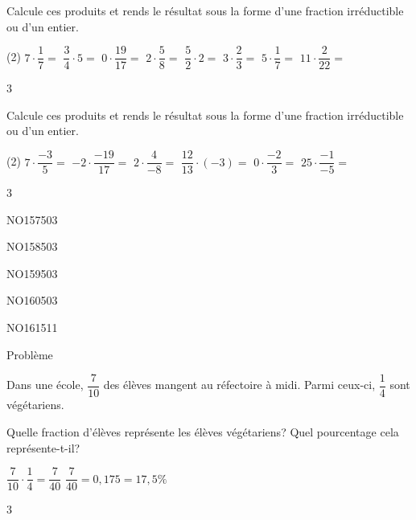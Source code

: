 \documentclass[a4paper,11pt]{report}
\begin{document}
\begin{exop}{
Calcule ces produits et rends le résultat sous la forme d'une fraction irréductible ou d'un entier.
\begin{tasks}(2)
	\task $7\cdot \dfrac{1}{7}=$
    \task $\dfrac{3}{4}\cdot5=$
	\task $0\cdot \dfrac{19}{17}=$
	\task $2\cdot \dfrac{5}{8}=$
    \task $\dfrac{5}{2}\cdot2=$
	\task $3\cdot \dfrac{2}{3}=$
	\task $5\cdot \dfrac{1}{7}=$
	\task $11\cdot \dfrac{2}{22}=$
\end{tasks}
}{3}
\end{exop}

\begin{exop}{
Calcule ces produits et rends le résultat sous la forme d'une fraction irréductible ou d'un entier.
\begin{tasks}(2)
	\task $7\cdot \dfrac{-3}{5}=$
	\task $-2\cdot \dfrac{-19}{17}=$
	\task $2\cdot \dfrac{4}{-8}=$
    \task $\dfrac{12}{13}\cdot(-3)=$
	\task $0\cdot \dfrac{-2}{3}=$
	\task $25\cdot \dfrac{-1}{-5}=$
\end{tasks}
}{3}
\end{exop}

\begin{exof}{NO157}{50}{3}
\end{exof}
\begin{exof}{NO158}{50}{3}
\end{exof}
\begin{exof}{NO159}{50}{3}
\end{exof}
\begin{exof}{NO160}{50}{3}
\end{exof}
\begin{exof}{NO161}{51}{1}
\end{exof}

\begin{resolu}{Problème}{Dans une école, $\dfrac{7}{10}$ des élèves mangent au réfectoire à midi. Parmi ceux-ci, $\dfrac{1}{4}$
sont végétariens. 
\begin{tasks}
    \task Quelle fraction d'élèves représente les élèves végétariens?
    \task Quel pourcentage cela représente-t-il?
\end{tasks}
\begin{tasks}
    

    \task $\dfrac{7}{10} \cdot \dfrac{1}{4} = \dfrac{7}{40}$
    \vspace{0.5cm}
    \task $\dfrac{7}{40}=0,175=17,5 \%$
\end{tasks}
}{3}
\end{resolu}
\end{document}
